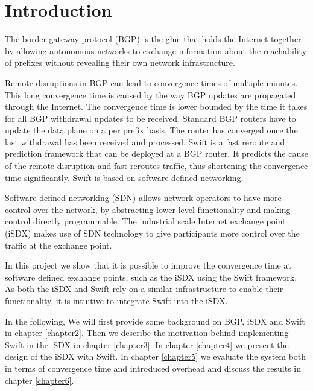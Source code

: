 

\chapter{\label{introduction}Introduction}
The border gateway protocol (BGP) is the glue that holds the Internet together by allowing 
autonomous networks to exchange information about the reachability of prefixes without revealing their own network infrastructure. 

Remote disruptions in BGP can lead to convergence times of multiple minutes. This long convergence time is caused by the way BGP updates are propagated through the Internet. The convergence time is lower bounded by the time it takes for all BGP withdrawal updates to be received. Standard BGP routers have to update the data plane on a per prefix basis. The router has converged once the last withdrawal has been received and processed. Swift is a fast reroute and prediction framework that can be deployed at a BGP router. It predicts the cause of the remote disruption and fast reroutes traffic, thus shortening the convergence time significantly. Swift is based on software defined networking. 

Software defined networking (SDN) allows network operators to have more control over the network, by abstracting lower level functionality and making control directly programmable. The industrial scale Internet exchange point (iSDX) makes use of SDN technology to give participants more control over the traffic at the exchange point. 

In this project we show that it is possible to improve the convergence time at software defined exchange points, such as the iSDX using the Swift framework. As both the iSDX and Swift rely on a similar infrastructure to enable their functionality, it is intuitive to integrate Swift into the iSDX. 

In the following, We will first provide some background on BGP, iSDX and Swift in chapter \ref{chapter2}. Then we describe the motivation behind implementing Swift in the iSDX in chapter \ref{chapter3}. In chapter \ref{chapter4} we present the design of the iSDX with Swift. In chapter \ref{chapter5} we evaluate the system both in terms of convergence time and introduced overhead and discuss the results in chapter \ref{chapter6}. 



